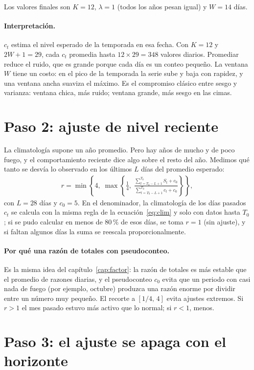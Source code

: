 Los valores finales son $K=12$, $\lambda=1$ (todos los años pesan igual) y $W=14$ días.

\paragraph{Interpretación.} $c_t$ estima el nivel esperado de la temporada en esa fecha. Con $K=12$ y $2W+1=29$, cada $c_t$ promedia hasta $12\times29=348$ valores diarios. Promediar reduce el ruido, que es grande porque cada día es un conteo pequeño. La ventana $W$ tiene un costo: en el pico de la temporada la serie sube y baja con rapidez, y una ventana ancha suaviza el máximo. Es el compromiso clásico entre sesgo y varianza: ventana chica, más ruido; ventana grande, más sesgo en las cimas.

\section{Paso 2: ajuste de nivel reciente}

La climatología supone un año promedio. Pero hay años de mucho y de poco fuego, y el comportamiento reciente dice algo sobre el resto del año. Medimos qué tanto se desvía lo observado en los últimos $L$ días del promedio esperado:
\begin{align}
  r=\min\!\left\{4,\;\max\!\left\{\tfrac14,\;\frac{\sum_{t=T_0-L+1}^{T_0}S_t+c_0}{\sum_{t=T_0-L+1}^{T_0}c_t+c_0}\right\}\right\},\label{eq:r}
\end{align}
con $L=28$ días y $c_0=5$. En el denominador, la climatología de los días pasados $c_t$ se calcula con la misma regla de la ecuación~\eqref{eq:clim} y solo con datos hasta $T_0$; si se pudo calcular en menos de $80\,\%$ de esos días, se toma $r=1$ (sin ajuste), y si faltan algunos días la suma se reescala proporcionalmente.

\paragraph{Por qué una razón de totales con pseudoconteo.} Es la misma idea del capítulo~\ref{cap:factor}: la razón de totales es más estable que el promedio de razones diarias, y el pseudoconteo $c_0$ evita que un periodo con casi nada de fuego (por ejemplo, octubre) produzca una razón enorme por dividir entre un número muy pequeño. El recorte a $[1/4,\,4]$ evita ajustes extremos. Si $r>1$ el mes pasado estuvo más activo que lo normal; si $r<1$, menos.

\section{Paso 3: el ajuste se apaga con el horizonte}

